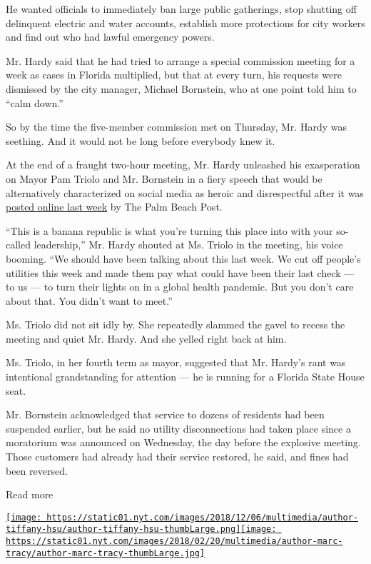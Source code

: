 He wanted officials to immediately ban large public gatherings, stop
shutting off delinquent electric and water accounts, establish more
protections for city workers and find out who had lawful emergency
powers.

Mr. Hardy said that he had tried to arrange a special commission meeting
for a week as cases in Florida multiplied, but that at every turn, his
requests were dismissed by the city manager, Michael Bornstein, who at
one point told him to ``calm down.''

So by the time the five-member commission met on Thursday, Mr. Hardy was
seething. And it would not be long before everybody knew it.

At the end of a fraught two-hour meeting, Mr. Hardy unleashed his
exasperation on Mayor Pam Triolo and Mr. Bornstein in a fiery speech
that would be alternatively characterized on social media as heroic and
disrespectful after it was
\href{https://www.youtube.com/watch?v=2bgCCXSrwHA\&t=59s}{posted online
last week} by The Palm Beach Post.

``This is a banana republic is what you're turning this place into with
your so-called leadership,'' Mr. Hardy shouted at Ms. Triolo in the
meeting, his voice booming. ``We should have been talking about this
last week. We cut off people's utilities this week and made them pay
what could have been their last check --- to us --- to turn their lights
on in a global health pandemic. But you don't care about that. You
didn't want to meet.''

Ms. Triolo did not sit idly by. She repeatedly slammed the gavel to
recess the meeting and quiet Mr. Hardy. And she yelled right back at
him.

Ms. Triolo, in her fourth term as mayor, suggested that Mr. Hardy's rant
was intentional grandstanding for attention --- he is running for a
Florida State House seat.

Mr. Bornstein acknowledged that service to dozens of residents had been
suspended earlier, but he said no utility disconnections had taken place
since a moratorium was announced on Wednesday, the day before the
explosive meeting. Those customers had already had their service
restored, he said, and fines had been reversed.

Read more

\href{https://www.nytimes.com/by/tiffany-hsu}{\texttt{[image: https://static01.nyt.com/images/2018/12/06/multimedia/author-tiffany-hsu/author-tiffany-hsu-thumbLarge.png]}}\href{https://www.nytimes.com/by/marc-tracy}{\texttt{[image: https://static01.nyt.com/images/2018/02/20/multimedia/author-marc-tracy/author-marc-tracy-thumbLarge.jpg]}}

